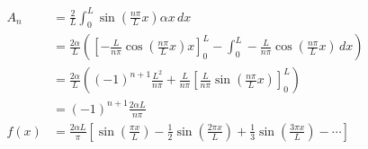 \documentclass{article}
\begin{document}
\begin{align*}
  A_n  & = \frac{2}{L} \int_0^L \sin \left( \frac{n \pi}{L} x \right) \alpha x \,dx                                                                                                                   \\
       & = \frac{2 \alpha}{L} \left( \left[ -\frac{L}{n \pi} \cos \left( \frac{n \pi}{L} x \right) x \right]_0^L - \int_0^L -\frac{L}{n \pi} \cos \left( \frac{n \pi}{L} x \right) \,dx \right)       \\
       & = \frac{2 \alpha}{L} \left( (-1)^{n + 1} \frac{L^2}{n \pi} + \frac{L}{n \pi} \left[ \frac{L}{n \pi} \sin \left( \frac{n \pi}{L} x \right) \right]_0^L \right)                                \\
       & = (-1)^{n + 1} \frac{2 \alpha L}{n \pi}                                                                                                                                                      \\
  f(x) & = \frac{2 \alpha L}{\pi} \left[ \sin \left( \frac{\pi x}{L} \right) - \frac{1}{2} \sin \left( \frac{2 \pi x}{L} \right) + \frac{1}{3} \sin \left( \frac{3 \pi x}{L} \right) - \cdots \right]
\end{align*}

\subsection{}
\end{document}
